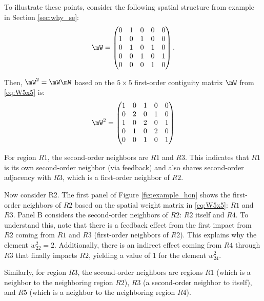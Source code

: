 \documentclass[english,12pt]{book}\usepackage[]{graphicx}\usepackage[]{xcolor}
\begin{document}
To illustrate these points, consider the following spatial structure from example in Section \ref{sec:why_se}:
\begin{equation}\label{eq:W5x5}
\mW = \begin{pmatrix}
      0 & 1 & 0 & 0 & 0 \\
      1 & 0 & 1 & 0 & 0 \\
      0 & 1 & 0 & 1 & 0 \\
      0 & 0 & 1 & 0 & 1 \\
      0 & 0 & 0 & 1 & 0
      \end{pmatrix}.
\end{equation}

Then, $\mW^2 = \mW\mW$ based on the $5\times 5$ first-order contiguity matrix $\mW$ from \eqref{eq:W5x5} is:
\begin{equation}
\mW^2 = \begin{pmatrix}\label{eq:W25x5}
      1 & 0 & 1 & 0 & 0 \\
      0 & 2 & 0 & 1 & 0 \\
      1 & 0 & 2 & 0 & 1 \\
      0 & 1 & 0 & 2 & 0 \\
      0 & 0 & 1 & 0 & 1
      \end{pmatrix}
\end{equation}

For region $R1$, the second-order neighbors are $R1$ and $R3$. This indicates that $R1$ is its own second-order neighbor (via feedback) and also shares second-order adjacency with $R3$, which is a first-order neighbor of $R2$. 

Now consider R2. The first panel of Figure \ref{fig:example_hon} shows the first-order neighbors of $R2$ based on the spatial weight matrix in \eqref{eq:W5x5}: $R1$ and $R3$. Panel B considers the second-order neighbors of $R2$: $R2$ itself and $R4$. To understand this, note that there is a feedback effect from the first impact from $R2$ coming from $R1$ and $R3$ (first-order neighbors of $R2$). This explains why the element $w^2_{22} = 2$. Additionally, there is an indirect effect coming from $R4$ through $R3$ that finally impacts $R2$, yielding a value of 1 for the element $w^2_{24}$.

Similarly, for region $R3$, the second-order neighbors are regions $R1$ (which is a neighbor to the neighboring region $R2$), $R3$ (a second-order neighbor to itself), and $R5$ (which is a neighbor to the neighboring region $R4$). 
\end{document}
